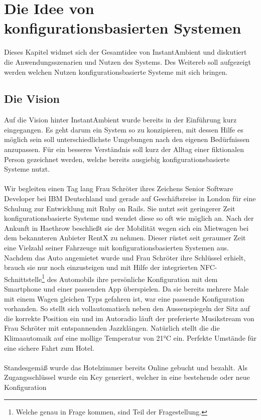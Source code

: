 \chapter{Die Idee von konfigurationsbasierten Systemen}

Dieses Kapitel widmet sich der Gesamtidee von InstantAmbient und diskutiert die Anwendungsszenarien und Nutzen des Systems. Des Weitereb soll aufgezeigt werden welchen 
Nutzen konfigurationsbasierte Systeme mit sich bringen. 

\section{Die Vision}
Auf die Vision hinter InstantAmbient wurde bereits in der Einführung kurz eingegangen. Es geht darum ein System so zu konzipieren, mit dessen Hilfe es möglich sein soll 
unterschiedlichste Umgebungen nach den eigenen Bedürfnissen anzupassen. Für ein besseres Verständnis soll kurz der Alltag einer fiktionalen Person gezeichnet werden, welche
bereits ausgiebig konfigurationsbasierte Systeme nutzt. 
\\\\
Wir begleiten einen Tag lang Frau Schröter ihres Zeichens Senior Software Developer bei IBM Deutschland und gerade auf Geschäftsreise in London für eine Schulung zur 
Entwicklung mit Ruby on Rails. Sie nutzt seit geringerer Zeit konfigurationsbasierte Systeme und wendet diese so oft wie möglich an. Nach der Ankunft in Haethrow beschließt 
sie der Mobilität wegen sich ein Mietwagen bei dem bekannteren Anbieter RentX zu nehmen. Dieser rüstet seit geraumer Zeit eine Vielzahl seiner Fahrzeuge mit 
konfigurationsbasierten Systemen aus. Nachdem das Auto angemietet wurde und Frau Schröter ihre Schlüssel erhielt, brauch sie nur noch einzusteigen und mit Hilfe der 
integrierten NFC-Schnittstelle\footnote{Welche genau in Frage kommen, sind Teil der Fragestellung.} des Automobils ihre persönliche Konfiguration mit dem Smartphone und einer 
passenden App überspielen. Da sie bereits mehrere Male mit einem Wagen gleichen Typs gefahren ist, war eine passende Konfiguration vorhanden. So stellt sich vollautomatisch
neben den Aussenspiegeln der Sitz auf die korrekte Position ein und im Autoradio läuft der preferierte Musikstream von Frau Schröter mit entspannenden Jazzklängen. Natürlich
stellt die die Klimaautomaik auf eine mollige Temperatur von 21°C ein. Perfekte Umstände für eine sichere Fahrt zum Hotel.
\\\\
Standesgemäß wurde das Hotelzimmer bereits Online gebucht und bezahlt. Als Zugangsschlüssel wurde ein Key generiert, welcher in eine bestehende oder neue Konfiguration 
